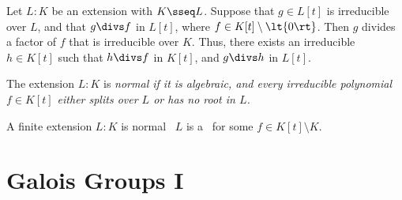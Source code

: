 \documentclass{article}
\begin{document}
\begin{tcorollary}
  Let \( L:K \) be an extension with \( K\sseq L \).
  Suppose that \( g\in L[t] \) is irreducible over \( L \), and that \( g\divs f \) in \( L[t] \), where \( f\in K[t]\setminus \lt\{ 0 \rt\} \).
  Then \( g \) divides a factor of \( f \) that is irreducible over \( K \).
  Thus, there exists an irreducible \( h\in K[t] \) such that \( h\divs f \) in \( K[t] \), and \( g\divs h \) in \( L[t] \).
\end{tcorollary}

\begin{tdefinition}
  The extension \( L:K \) is \it{normal} if it is algebraic, and every irreducible polynomial \( f\in K[t] \) either splits over \( L \) or has no root in \( L \).
\end{tdefinition}


\begin{ttheorem}
  A finite extension \( L:K \) is normal \iff~\( L \) is a \sfe~for some \( f\in K[t]\setminus K \).
\end{ttheorem}
\section{Galois Groups I}

\end{document}
